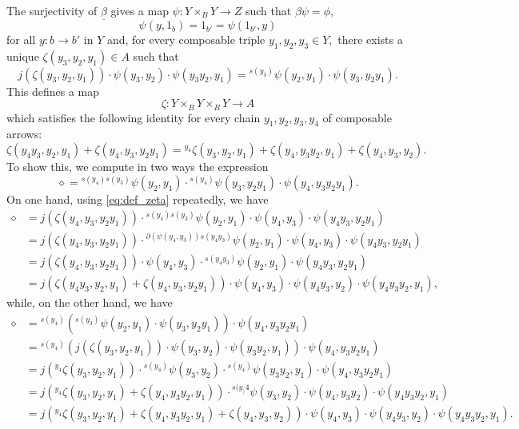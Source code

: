 \documentclass[11pt]{amsart}
\theoremstyle{plain}
\theoremstyle{definition}
\theoremstyle{remark}
\newcommand{\un}{\underline}
\begin{document}
The surjectivity of $\un{\beta}$ gives a map $\psi \colon Y \times_B Y \to Z$ such that $ \beta \psi = \phi$,
\[\psi(y,1_b) = 1_{b'} = \psi(1_{b'},y)\]
for all $y\colon b\to b'$ in $Y$ and, for every composable triple $y_1, y_2, y_3 \in Y,$ there exists a unique $\zeta(y_3, y_2, y_1) \in A$ such that
\begin{equation} \label{eq:def_zeta}
	j(\zeta (y_3, y_2, y_1)) \cdot \psi (y_3,y_2) \cdot \psi (y_3y_2,y_1) = {}^{s(y_3)}\psi(y_2,y_1) \cdot \psi (y_3,y_2y_1).
\end{equation}
This defines a map
\[ \zeta \colon Y \times_B Y \times_B Y \to A \]
which satisfies the following identity for every chain $y_1, y_2, y_3, y_4$ of composable arrows:
\begin{equation} \label{eq:cocycle}
	\zeta(y_4y_3,y_2,y_1) + \zeta(y_4,y_3,y_2y_1) = {}^{y_4}\zeta(y_3,y_2,y_1) + \zeta (y_4,y_3y_2,y_1) + \zeta(y_4,y_3,y_2).
\end{equation}
To show this, we compute in two ways the expression
\[ \diamond = {}^{s(y_4)s(y_3)}\psi(y_2,y_1) \cdot {}^{s(y_4)}\psi(y_3,y_2y_1) \cdot \psi(y_4,y_3y_2y_1). \]
On one hand, using \eqref{eq:def_zeta} repeatedly, we have
\begin{align*}
	\diamond & = j(\zeta (y_4, y_3, y_2y_1)) \cdot {}^{s(y_4)s(y_3)}\psi(y_2,y_1) \cdot \psi (y_4,y_3) \cdot \psi (y_4y_3,y_2y_1) \\
	& =  j(\zeta (y_4, y_3, y_2y_1)) \cdot  {}^{\partial(\psi(y_4,y_3))s(y_4y_3)}\psi(y_2,y_1) \cdot \psi (y_4,y_3) \cdot \psi (y_4y_3,y_2y_1) \\
	& = j(\zeta (y_4, y_3, y_2y_1)) \cdot \psi(y_4,y_3)\cdot {}^{s(y_4y_3)} \psi(y_2,y_1) \cdot \psi (y_4y_3,y_2y_1) \\
	& = j(\zeta(y_4y_3,y_2,y_1) + \zeta (y_4, y_3, y_2y_1)) \cdot \psi(y_4,y_3) \cdot \psi(y_4y_3,y_2) \cdot \psi(y_4y_3y_2,y_1),
\end{align*}
while, on the other hand, we have
\begin{align*}
	\diamond & = {}^{s(y_4)} ({}^{s(y_3)} \psi(y_2,y_1) \cdot \psi(y_3,y_2y_1)) \cdot \psi(y_4,y_3y_2y_1) \\
	& = {}^{s(y_4)} (j(\zeta(y_3,y_2,y_1)) \cdot \psi(y_3,y_2) \cdot \psi(y_3y_2,y_1)) \cdot \psi(y_4,y_3y_2y_1) \\
	& = j({}^{y_4}\zeta(y_3,y_2,y_1)) \cdot {}^{s(y_4)} \psi(y_3,y_2) \cdot {}^{s(y_4)} \psi(y_3y_2,y_1) \cdot \psi(y_4,y_3y_2y_1) \\
	& = j({}^{y_4}\zeta(y_3,y_2,y_1) + \zeta(y_4,y_3y_2,y_1)) \cdot {}^{s(y_)4} \psi(y_3,y_2) \cdot \psi(y_4,y_3y_2) \cdot \psi(y_4y_3y_2,y_1) \\
	& = j({}^{y_4}\zeta(y_3,y_2,y_1) + \zeta(y_4,y_3y_2,y_1) + \zeta(y_4,y_3,y_2)) \cdot \psi(y_4,y_3) \cdot \psi(y_4y_3,y_2) \cdot \psi(y_4y_3y_2,y_1).
\end{align*}
\end{document}
